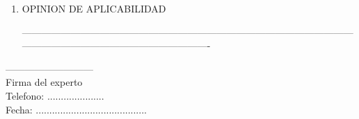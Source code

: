 \documentclass[12pt,a4paper]{article}
\begin{document}
\begin{enumerate}
	\item OPINION DE APLICABILIDAD

	      ----------------------------------------------------------------------------------------------------------------------------------------------------------------
\end{enumerate}

\begin{center}

	---------------------------\\
	Firma del experto\\
	Telefono: .....................\\
	Fecha: .........................................
\end{center}
\end{document}
